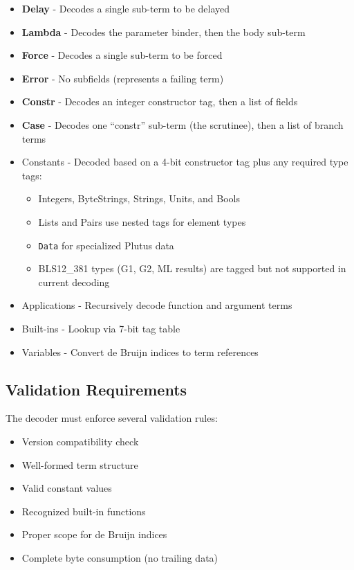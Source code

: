 \documentclass[../midgard.tex]{subfiles}
\begin{document}
\begin{itemize}
    \item \textbf{Delay} - Decodes a single sub-term to be delayed
    \item \textbf{Lambda} - Decodes the parameter binder, then the body sub-term
    \item \textbf{Force} - Decodes a single sub-term to be forced
    \item \textbf{Error} - No subfields (represents a failing term)
    \item \textbf{Constr} - Decodes an integer constructor tag, then a list of fields
    \item \textbf{Case} - Decodes one “constr” sub-term (the scrutinee), then a list of branch terms

    \item Constants - Decoded based on a 4-bit constructor tag plus any required type tags:
    \begin{itemize}
      \item Integers, ByteStrings, Strings, Units, and Bools
      \item Lists and Pairs use nested tags for element types
      \item \texttt{Data} for specialized Plutus data
      \item BLS12\_381 types (G1, G2, ML results) are tagged but not supported in current decoding
    \end{itemize}
    \item Applications - Recursively decode function and argument terms
    \item Built-ins - Lookup via 7-bit tag table
    \item Variables - Convert de Bruijn indices to term references
\end{itemize}

\subsection{Validation Requirements}

The decoder must enforce several validation rules:

\begin{itemize}
    \item Version compatibility check
    \item Well-formed term structure
    \item Valid constant values
    \item Recognized built-in functions
    \item Proper scope for de Bruijn indices
    \item Complete byte consumption (no trailing data)
\end{itemize}
\end{document}
